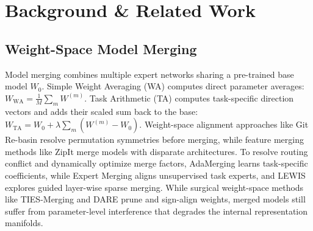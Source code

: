 \documentclass{article}
\theoremstyle{plain}
\theoremstyle{definition}
\theoremstyle{remark}
\begin{document}
\section{Background \& Related Work}
\label{submission-background}

\subsection{Weight-Space Model Merging}
Model merging combines multiple expert networks sharing a pre-trained base model $W_0$. Simple Weight Averaging (WA) \cite{wortsman2022model} computes direct parameter averages: $W_{\text{WA}} = \frac{1}{M}\sum_m W^{(m)}$. Task Arithmetic (TA) \cite{ilharco2023editing} computes task-specific direction vectors and adds their scaled sum back to the base: $W_{\text{TA}} = W_0 + \lambda \sum_m (W^{(m)} - W_0)$. Weight-space alignment approaches like Git Re-basin \cite{ainsworth2023gitrebasin} resolve permutation symmetries before merging, while feature merging methods like ZipIt \cite{stoica2024zipit} merge models with disparate architectures. To resolve routing conflict and dynamically optimize merge factors, AdaMerging \cite{yang2024adamerging} learns task-specific coefficients, while Expert Merging \cite{zhang2025expert} aligns unsupervised task experts, and LEWIS \cite{chopra2025lewis} explores guided layer-wise sparse merging. While surgical weight-space methods like TIES-Merging \cite{yadav2023ties} and DARE \cite{yu2024language} prune and sign-align weights, merged models still suffer from parameter-level interference that degrades the internal representation manifolds.
\end{document}

